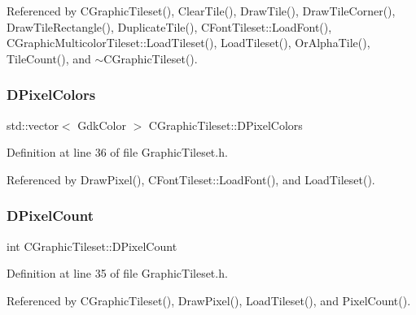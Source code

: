 Referenced by C\+Graphic\+Tileset(), Clear\+Tile(), Draw\+Tile(), Draw\+Tile\+Corner(), Draw\+Tile\+Rectangle(), Duplicate\+Tile(), C\+Font\+Tileset\+::\+Load\+Font(), C\+Graphic\+Multicolor\+Tileset\+::\+Load\+Tileset(), Load\+Tileset(), Or\+Alpha\+Tile(), Tile\+Count(), and $\sim$\+C\+Graphic\+Tileset().

\hypertarget{classCGraphicTileset_a4e9672b8b133dbac600fb8bb400d1cb3}{}\label{classCGraphicTileset_a4e9672b8b133dbac600fb8bb400d1cb3} 
\subsubsection{\texorpdfstring{D\+Pixel\+Colors}{DPixelColors}}
{\footnotesize\ttfamily std\+::vector$<$ Gdk\+Color $>$ C\+Graphic\+Tileset\+::\+D\+Pixel\+Colors\hspace{0.3cm}{\ttfamily [protected]}}



Definition at line 36 of file Graphic\+Tileset.\+h.



Referenced by Draw\+Pixel(), C\+Font\+Tileset\+::\+Load\+Font(), and Load\+Tileset().

\hypertarget{classCGraphicTileset_a55fc9ceb1c92383c124e61c911fe57db}{}\label{classCGraphicTileset_a55fc9ceb1c92383c124e61c911fe57db} 
\subsubsection{\texorpdfstring{D\+Pixel\+Count}{DPixelCount}}
{\footnotesize\ttfamily int C\+Graphic\+Tileset\+::\+D\+Pixel\+Count\hspace{0.3cm}{\ttfamily [protected]}}



Definition at line 35 of file Graphic\+Tileset.\+h.



Referenced by C\+Graphic\+Tileset(), Draw\+Pixel(), Load\+Tileset(), and Pixel\+Count().

\hypertarget{classCGraphicTileset_a650c021d8ea1724a4c9564600df0da05}{}\label{classCGraphicTileset_a650c021d8ea1724a4c9564600df0da05} 
